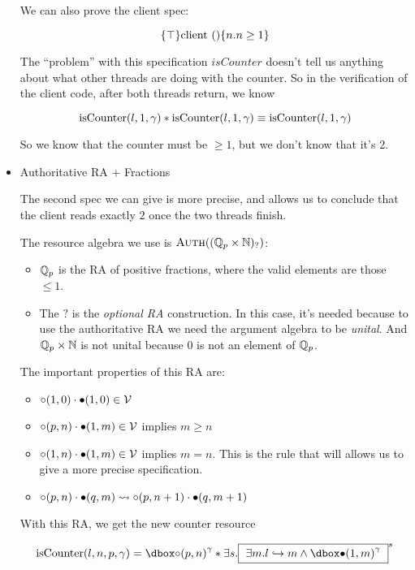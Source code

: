 \begin{itemize}
We can also prove the client spec:

\[ \{\top\} \text{client} \text{ } () \{n. n \ge 1\} \]

The ``problem'' with this specification $isCounter$ doesn't tell us anything about what other threads are doing with the counter. So in the verification of the client code, after both threads return, we know 

\[ \text{isCounter}(l, 1, \gamma)  * \text{isCounter}(l, 1, \gamma) \equiv \text{isCounter}(l, 1, \gamma) \]

So we know that the counter must be $\ge 1$, but we don't know that it's 2.

\item Authoritative RA + Fractions

The second spec we can give is more precise, and allows us to conclude that the client reads exactly $2$ once the two threads finish.

The resource algebra we use is $\textsc{Auth}((\mathbb{Q}_p \times \mathbb{N})_{?})$:
\begin{itemize}
\item $\mathbb{Q}_p$ is the RA of positive fractions, where the valid elements are those $\le 1$.
\item The $?$ is the \emph{optional RA} construction. In this case, it's needed because to use the authoritative RA we need the argument algebra to be \emph{unital}. And $\mathbb{Q}_p \times \mathbb{N}$ is not unital because $0$ is not an element of $\mathbb{Q}_p$.
\end{itemize}

The important properties of this RA are:
\begin{itemize}
\item $\circ (1, 0) \cdot \bullet (1, 0) \in \mathcal{V}$
\item $\circ (p, n) \cdot \bullet (1, m) \in \mathcal{V}$ implies $m \ge n$
\item $\circ (1, n) \cdot \bullet (1, m) \in \mathcal{V}$ implies $m = n$. This is the rule that will allows us to give a more precise specification.
\item $\circ (p, n) \cdot \bullet (q, m) \rightsquigarrow \circ (p, n + 1) \cdot \bullet (q, m + 1)$
\end{itemize}

With this RA, we get the new counter resource

\[ \isCounterF{l}{n}{p}{\gamma} = \ownr{\naelem{(p, n)}} {\gamma} * \exists s.\inv{ $\exists m. \pointsto{l}{m} \land \ownr{\aelem{(1, m)}}{\gamma} $ }{s} \]

\end{itemize}

